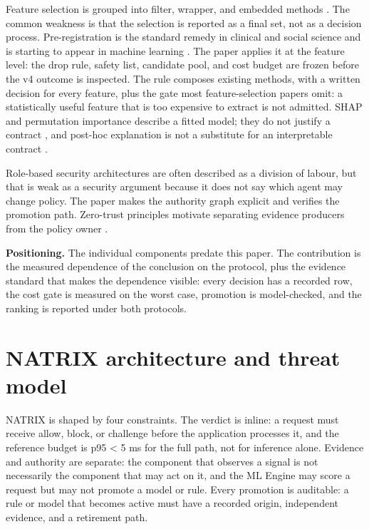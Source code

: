 \documentclass[preprint,11pt]{elsarticle}
\begin{document}
Feature selection is grouped into filter, wrapper, and embedded methods
\citep{guyon2003introduction}. The common weakness is that the selection
is reported as a final set, not as a decision process. Pre-registration
is the standard remedy in clinical and social science and is starting to
appear in machine learning \citep{nosek2018preregistration}. The paper
applies it at the feature level: the drop rule, safety list, candidate
pool, and cost budget are frozen before the v4 outcome is inspected. The
rule composes existing methods, with a written decision for every
feature, plus the gate most feature-selection papers omit: a
statistically useful feature that is too expensive to extract is not
admitted. SHAP and permutation importance describe a fitted model; they
do not justify a contract \citep{lundberg2017unified}, and post-hoc
explanation is not a substitute for an interpretable contract
\citep{rudin2019stop}.

Role-based security architectures are often described as a division of
labour, but that is weak as a security argument because it does not say
which agent may change policy. The paper makes the authority graph
explicit and verifies the promotion path. Zero-trust principles motivate
separating evidence producers from the policy owner
\citep{nist2020zero}.

\textbf{Positioning.} The individual components predate this paper. The
contribution is the measured dependence of the conclusion on the
protocol, plus the evidence standard that makes the dependence visible:
every decision has a recorded row, the cost gate is measured on the
worst case, promotion is model-checked, and the ranking is reported
under both protocols.

\section{NATRIX architecture and threat
model}\label{natrix-architecture-and-threat-model}

NATRIX is shaped by four constraints. The verdict is inline: a request
must receive allow, block, or challenge before the application processes
it, and the reference budget is p95 \textless{} 5 ms for the full path,
not for inference alone. Evidence and authority are separate: the
component that observes a signal is not necessarily the component that
may act on it, and the ML Engine may score a request but may not promote
a model or rule. Every promotion is auditable: a rule or model that
becomes active must have a recorded origin, independent evidence, and a
retirement path.
\end{document}
